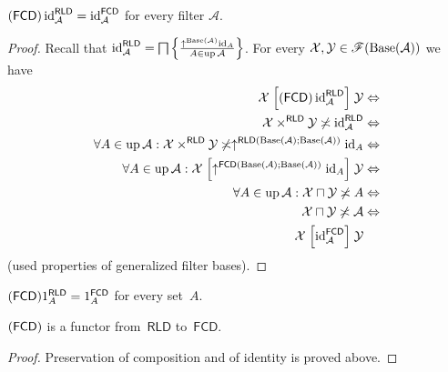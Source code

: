 \begin{prop}\label{fcd-id}
$(\mathsf{FCD})\operatorname{id}_{\mathcal{A}}^{\mathsf{RLD}}=\operatorname{id}_{\mathcal{A}}^{\mathsf{FCD}}$
for every filter $\mathcal{A}$.\end{prop}
\begin{proof}
Recall that $\operatorname{id}_{\mathcal{A}}^{\mathsf{RLD}}=\bigsqcap\left\{ \frac{\uparrow^{\operatorname{Base}(\mathcal{A})}\operatorname{id}_{A}}{A\in\operatorname{up}\mathcal{A}}\right\}$.
For every $\mathcal{X},\mathcal{Y}\in\mathscr{F}(\operatorname{Base}(\mathcal{A}))$ we
have
\begin{align*}
\mathcal{X}\mathrel{\left[(\mathsf{FCD})\operatorname{id}_{\mathcal{A}}^{\mathsf{RLD}}\right]}\mathcal{Y} & \Leftrightarrow\\
\mathcal{X}\times^{\mathsf{RLD}}\mathcal{Y}\not\asymp\operatorname{id}_{\mathcal{A}}^{\mathsf{RLD}} & \Leftrightarrow\\
\forall A\in\operatorname{up}\mathcal{A}:\mathcal{X}\times^{\mathsf{RLD}}\mathcal{Y}\not\asymp\uparrow^{\mathsf{RLD}(\operatorname{Base}(\mathcal{A});\operatorname{Base}(\mathcal{A}))}\operatorname{id}_{A} & \Leftrightarrow\\
\forall A\in\operatorname{up}\mathcal{A}:\mathcal{X}\mathrel{\left[\uparrow^{\mathsf{FCD}(\operatorname{Base}(\mathcal{A});\operatorname{Base}(\mathcal{A}))}\operatorname{id}_{A}\right]}\mathcal{Y} & \Leftrightarrow\\
\forall A\in\operatorname{up}\mathcal{A}:\mathcal{X}\sqcap\mathcal{Y}\not\asymp A & \Leftrightarrow\\
\mathcal{X}\sqcap\mathcal{Y}\not\asymp\mathcal{A} & \Leftrightarrow\\
\mathcal{X}\mathrel{\left[\operatorname{id}_{\mathcal{A}}^{\mathsf{FCD}}\right]}\mathcal{Y}
\end{align*}
(used properties of generalized filter bases).\end{proof}
\begin{cor}
$(\mathsf{FCD})1_{A}^{\mathsf{RLD}}=1_{A}^{\mathsf{FCD}}$ for every set~$A$.\end{cor}
\begin{prop}
$(\mathsf{FCD})$ is a functor from~$\mathsf{RLD}$ to~$\mathsf{FCD}$.\end{prop}
\begin{proof}
Preservation of composition and of identity is proved above.
\end{proof}

